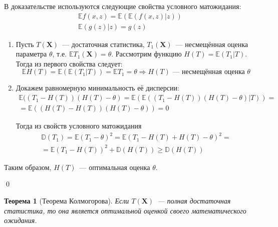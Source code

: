 \documentclass[oneside,final,14pt]{extreport}
\renewenvironment{proof}{{\bfseries Доказательство.}}{\qed}
\newtheorem{thm}{Теорема}[section]
\theoremstyle{definition}
\begin{document}
\begin{proof}
В доказательстве используются следующие свойства условного матожидания: 
\begin{gather*}
    \mathbb{E} f(x, z)=\mathbb{E}(\mathbb{E}(f(x, z) | z)) \\
    \mathbb{E}(g(z) | z)=g(z)
\end{gather*}

\begin{enumerate}
    \item Пусть $T(\mathbf{X})$~--- достаточная статистика, $T_1(\mathbf{X})$~--- несмещённая оценка параметра $\theta$, т.е. $\mathbb{E} T_{1}(\mathbf{X})=\theta$. Рассмотрим функцию $H(T)=\mathbb{E}\left(T_{1} | T\right)$. Тогда из первого свойства следует:
    \begin{equation*}
        \mathbb{E} H(T)=\mathbb{E}\left(\mathbb{E}\left(T_{1} |     T\right)\right)=\mathbb{E} T_{1}=\theta \Rightarrow H(T)     \text{~--- несмещённая оценка~} \theta
    \end{equation*}

    \item Докажем равномерную минимальность её дисперсии:
    \begin{multline*}
        \mathbb{E}((T_{1}-H(T))(H(T)-\theta)
        = \mathbb{E}(\mathbb{E}((T_{1}-H(T))(H(T)-\theta) | T)) 
        = \\
        = \mathbb{E}((H(T)-H(T))(H(T)-\theta))
        = 0
    \end{multline*}

    Тогда из свойств условного матожидания
    \begin{multline*}
        \mathbb{D}\left(T_{1}\right) 
        = \mathbb{E}\left(T_{1}-\theta\right)^{2}=\mathbb{E}\left(T_{1}-H(T)+H(T)-\theta\right)^{2} =\\
        = \mathbb{E}\left(T_{1}-H(T)\right)^{2}+\mathbb{D}(H(T)) \geqslant \mathbb{D}(H(T))
    \end{multline*}
\end{enumerate}
Таким образом, $H(T)$~--- оптимальная оценка $\theta$.

\end{proof}

\begin{thm}[Теорема Колмогорова]
Если $T(\mathbf{X})$~--- полная достаточная статистика, то она является оптимальной оценкой своего математического ожидания.
\end{thm}
\end{document}
